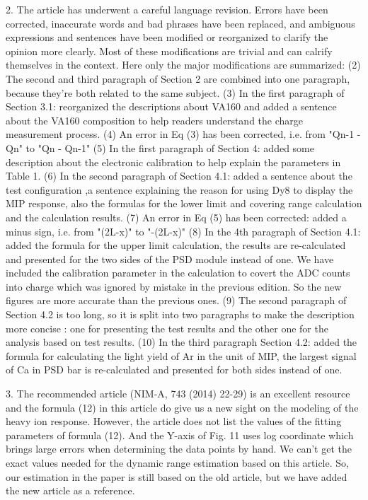 \documentclass[]{article}
\begin{document}
2. The article has underwent a careful language revision. Errors have been corrected, inaccurate words and bad phrases have been replaced, and ambiguous expressions and sentences have been modified or reorganized to clarify the opinion more clearly. 
Most of these modifications are trivial and can calrify themselves in the context. Here only the major modifications are summarized:
     (2) The second and third paragraph of Section 2 are combined into one paragraph, because they're both related to the same subject.
     (3) In the first paragraph of Section 3.1: reorganized the descriptions about VA160 and added a sentence about the VA160 composition to help readers understand the charge measurement process.
     (4) An error in Eq (3) has been corrected, i.e. from "Qn-1 - Qn" to "Qn - Qn-1"
     (5) In the first paragraph of Section 4: added some description about the electronic calibration to help explain the parameters in Table 1.
     (6) In the second paragraph of Section 4.1: added a sentence about the test configuration ,a sentence explaining the reason for using Dy8 to display the MIP response, also the formulas for the lower limit and covering range calculation and the calculation results.
     (7) An error in Eq (5) has been corrected: added a minus sign, i.e. from "(2L-x)" to "-(2L-x)"
     (8) In the 4th paragraph of Section 4.1: added the formula for the upper limit calculation, the results are re-calculated and presented for the two sides of the PSD module instead of one. We have included the calibration parameter in the calculation to covert the ADC counts into charge which was ignored by mistake in the previous edition. So the new figures are more accurate than the previous ones.
     (9) The second paragraph of Section 4.2 is too long, so it is split into two paragraphs to make the description more concise : one for presenting the test results and the other one for the analysis based on test results.  
     (10) In the third paragraph Section 4.2: added the formula for calculating the light yield of Ar in the unit of MIP, the largest signal of Ca in PSD bar is re-calculated and  presented for both sides instead of one.
      

3. The recommended article (NIM-A, 743 (2014) 22-29) is an excellent resource and the formula (12) in this article do give us a new sight on the modeling of the heavy ion response. However, the article does not list the values of the fitting parameters of formula (12). And the Y-axis of Fig. 11 uses log coordinate which brings large errors when determining the data points by hand. We can't get the exact values needed for the dynamic range estimation based on this article. So, our estimation in the paper is still based on the old article, but we have added the new article as a reference.
\end{document}
